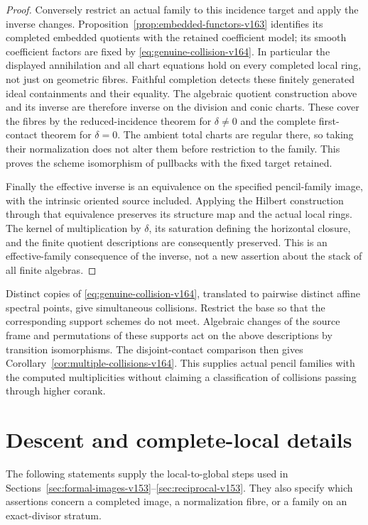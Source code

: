 \documentclass[11pt,reqno]{amsart}
\numberwithin{equation}{section}
\theoremstyle{definition}\newtheorem{definition}[theorem]{Definition}
\theoremstyle{remark}\newtheorem{remark}[theorem]{Remark}
\begin{document}
\begin{proof}
Conversely restrict an actual family to this incidence target and
apply the inverse changes. Proposition~\ref{prop:embedded-functors-v163}
identifies its completed embedded quotients with the retained
coefficient model; its smooth coefficient factors are fixed by
\eqref{eq:genuine-collision-v164}. In particular the displayed
annihilation and all chart equations hold on every completed local
ring, not just on geometric fibres. Faithful completion detects
these finitely generated ideal containments and their equality.
The algebraic quotient construction above and its inverse are
therefore inverse on the division and conic charts. These cover
the fibres by the reduced-incidence theorem for $\delta\ne0$ and
the complete first-contact theorem for $\delta=0$. The ambient
total charts are regular there, so taking their normalization does
not alter them before restriction to the family. This proves the
scheme isomorphism of pullbacks with the fixed target retained.

Finally the effective inverse is an equivalence on the specified
pencil-family image, with the intrinsic oriented source included.
Applying the Hilbert construction through that equivalence preserves
its structure map and the actual local rings. The kernel of
multiplication by $\delta$, its saturation defining the horizontal
closure, and the finite quotient descriptions are consequently
preserved. This is an effective-family consequence of the inverse,
not a new assertion about the stack of all finite algebras.
\end{proof}

Distinct copies of \eqref{eq:genuine-collision-v164}, translated to
pairwise distinct affine spectral points, give simultaneous
collisions. Restrict the base so that the corresponding support
schemes do not meet. Algebraic changes of the source frame and
permutations of these supports act on the above descriptions by
transition isomorphisms. The disjoint-contact comparison then gives
Corollary~\ref{cor:multiple-collisions-v164}. This supplies actual
pencil families with the computed multiplicities without claiming a
classification of collisions passing through higher corank.

\section{Descent and complete-local details}
\label{sec:formal-details-v154}
The following statements supply the local-to-global steps used in
Sections~\ref{sec:formal-images-v153}--\ref{sec:reciprocal-v153}.
They also specify which assertions concern a completed image, a
normalization fibre, or a family on an exact-divisor stratum.
\end{document}
